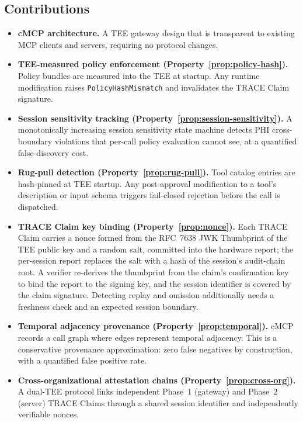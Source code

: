 \subsection*{Contributions}

\begin{itemize}[leftmargin=1.5em]
  \item \textbf{cMCP architecture.} A TEE gateway design that is transparent to existing MCP
    clients and servers, requiring no protocol changes.

  \item \textbf{TEE-measured policy enforcement (Property~\ref{prop:policy-hash}).} Policy
    bundles are measured into the TEE at startup. Any runtime modification raises
    \texttt{PolicyHashMismatch} and invalidates the TRACE Claim signature.

  \item \textbf{Session sensitivity tracking (Property~\ref{prop:session-sensitivity}).}
    A monotonically increasing session sensitivity state machine detects PHI cross-boundary
    violations that per-call policy evaluation cannot see, at a quantified false-discovery cost.

  \item \textbf{Rug-pull detection (Property~\ref{prop:rug-pull}).} Tool catalog entries are
    hash-pinned at TEE startup. Any post-approval modification to a tool's description or
    input schema triggers fail-closed rejection before the call is dispatched.

  \item \textbf{TRACE Claim key binding (Property~\ref{prop:nonce}).} Each TRACE Claim
    carries a nonce formed from the RFC~7638 JWK Thumbprint of the TEE public key and a
    random salt, committed into the hardware report; the per-session report replaces the
    salt with a hash of the session's audit-chain root. A verifier re-derives the
    thumbprint from the claim's confirmation key to bind the report to the signing key, and
    the session identifier is covered by the claim signature. Detecting replay and omission
    additionally needs a freshness check and an expected session boundary.

  \item \textbf{Temporal adjacency provenance (Property~\ref{prop:temporal}).} cMCP
    records a call graph where edges represent temporal adjacency. This is a conservative
    provenance approximation: zero false negatives by construction, with a quantified false
    positive rate.

  \item \textbf{Cross-organizational attestation chains (Property~\ref{prop:cross-org}).}
    A dual-TEE protocol links independent Phase~1 (gateway) and Phase~2 (server) TRACE
    Claims through a shared session identifier and independently verifiable nonces.
\end{itemize}

